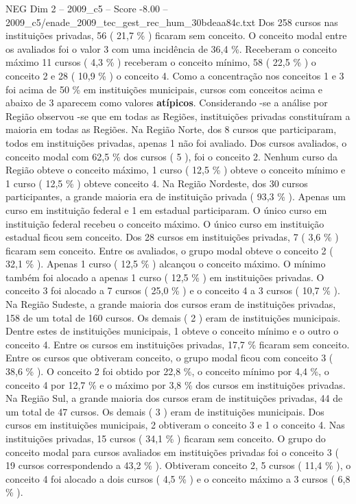 \begin{textsample}{NEG Dim 2 – 2009\_c5 – Score -8.00 – 2009\_c5/enade\_2009\_tec\_gest\_rec\_hum\_30bdeaa84c.txt}
Dos 258 cursos nas instituições privadas, 56 ( 21,7 \% ) ficaram sem conceito.
O conceito modal entre os avaliados foi o valor 3 com uma incidência de 36,4 \%.
Receberam o conceito máximo 11 cursos ( 4,3 \% ) receberam o conceito mínimo, 58 ( 22,5 \% ) o conceito 2 e 28 ( 10,9 \% ) o conceito 4.
Como a concentração nos conceitos 1 e 3 foi acima de 50 \% em instituições municipais, cursos com conceitos acima e abaixo de 3 aparecem como valores \textbf{atípicos}.
Considerando -se a análise por Região observou -se que em todas as Regiões, instituições privadas constituíram a maioria em todas as Regiões.
Na Região Norte, dos 8 cursos que participaram, todos em instituições privadas, apenas 1 não foi avaliado.
Dos cursos avaliados, o conceito modal com 62,5 \% dos cursos ( 5 ), foi o conceito 2.
Nenhum curso da Região obteve o conceito máximo, 1 curso ( 12,5 \% ) obteve o conceito mínimo e 1 curso ( 12,5 \% ) obteve conceito 4.
Na Região Nordeste, dos 30 cursos participantes, a grande maioria era de instituição privada ( 93,3 \% ).
Apenas um curso em instituição federal e 1 em estadual participaram.
O único curso em instituição federal recebeu o conceito máximo.
O único curso em instituição estadual ficou sem conceito.
Dos 28 cursos em instituições privadas, 7 ( 3,6 \% ) ficaram sem conceito.
Entre os avaliados, o grupo modal obteve o conceito 2 ( 32,1 \% ).
Apenas 1 curso ( 12,5 \% ) alcançou o conceito máximo.
O mínimo também foi alocado a apenas 1 curso ( 12,5 \% ) em instituições privadas.
O conceito 3 foi alocado a 7 cursos ( 25,0 \% ) e o conceito 4 a 3 cursos ( 10,7 \% ).
Na Região Sudeste, a grande maioria dos cursos eram de instituições privadas, 158 de um total de 160 cursos.
Os demais ( 2 ) eram de instituições municipais.
Dentre estes de instituições municipais, 1 obteve o conceito mínimo e o outro o conceito 4.
Entre os cursos em instituições privadas, 17,7 \% ficaram sem conceito.
Entre os cursos que obtiveram conceito, o grupo modal ficou com conceito 3 ( 38,6 \% ).
O conceito 2 foi obtido por 22,8 \%, o conceito mínimo por 4,4 \%, o conceito 4 por 12,7 \% e o máximo por 3,8 \% dos cursos em instituições privadas.
Na Região Sul, a grande maioria dos cursos eram de instituições privadas, 44 de um total de 47 cursos.
Os demais ( 3 ) eram de instituições municipais.
Dos cursos em instituições municipais, 2 obtiveram o conceito 3 e 1 o conceito 4.
Nas instituições privadas, 15 cursos ( 34,1 \% ) ficaram sem conceito.
O grupo do conceito modal para cursos avaliados em instituições privadas foi o conceito 3 ( 19 cursos correspondendo a 43,2 \% ).
Obtiveram conceito 2, 5 cursos ( 11,4 \% ), o conceito 4 foi alocado a dois cursos ( 4,5 \% ) e o conceito máximo a 3 cursos ( 6,8 \% ).

\end{textsample}
